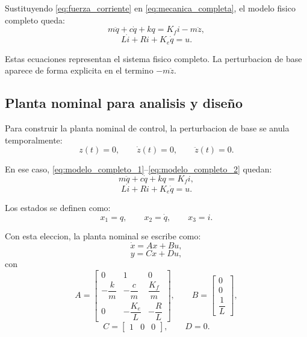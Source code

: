 \documentclass[11pt]{article}
\begin{document}
Sustituyendo \eqref{eq:fuerza_corriente} en \eqref{eq:mecanica_completa}, el modelo fisico completo queda:
\begin{equation}
m\ddot q + c\dot q + kq = K_f i - m\ddot z,
\label{eq:modelo_completo_1}
\end{equation}
\begin{equation}
L\dot i + Ri + K_e\dot q = u.
\label{eq:modelo_completo_2}
\end{equation}

Estas ecuaciones representan el sistema fisico completo. La perturbacion de base aparece de forma explicita en el termino $-m\ddot z$.

\subsection{Planta nominal para analisis y dise\~no}

Para construir la planta nominal de control, la perturbacion de base se anula temporalmente:
\[
z(t)=0,\qquad \dot z(t)=0,\qquad \ddot z(t)=0.
\]

En ese caso, \eqref{eq:modelo_completo_1}--\eqref{eq:modelo_completo_2} quedan:
\begin{equation}
m\ddot q + c\dot q + kq = K_f i,
\end{equation}
\begin{equation}
L\dot i + Ri + K_e\dot q = u.
\end{equation}

Los estados se definen como:
\[
x_1=q,\qquad x_2=\dot q,\qquad x_3=i.
\]

Con esta eleccion, la planta nominal se escribe como:
\begin{equation}
\dot x = Ax+Bu,
\end{equation}
\begin{equation}
y = Cx+Du,
\end{equation}
con
\begin{equation}
A=
\begin{bmatrix}
0 & 1 & 0\\
-\dfrac{k}{m} & -\dfrac{c}{m} & \dfrac{K_f}{m}\\
0 & -\dfrac{K_e}{L} & -\dfrac{R}{L}
\end{bmatrix},
\qquad
B=
\begin{bmatrix}
0\\
0\\
\dfrac{1}{L}
\end{bmatrix},
\end{equation}
\begin{equation}
C=
\begin{bmatrix}
1 & 0 & 0
\end{bmatrix},
\qquad
D=0.
\end{equation}
\end{document}
